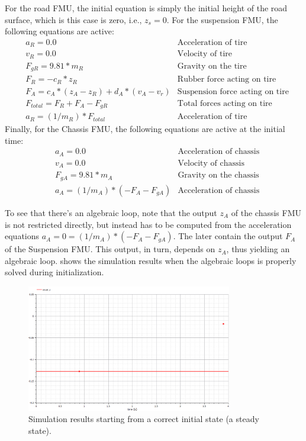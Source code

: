 For the road FMU, the initial equation is simply the initial height of the road surface, which is this case is zero, i.e., $z_s=0$.
For the suspension FMU, the following equations are active:
\begin{align}
& a_R = 0.0 & \text{Acceleration of tire} \\
& v_R = 0.0 & \text{Velocity of tire} \\
& F_{gR} = 9.81 * m_R  & \text{Gravity on the tire} \\
& F_R = - c_R * z_R  & \text{Rubber force acting on tire} \\
& F_A = c_A * (z_A - z_R) + d_A * (v_A - v_r)  & \text{Suspension force acting on tire} \\
& F_{\mathit{total}} = F_R + F_A - F_{gR} & \text{Total forces acting on tire} \\
& a_R = (1/m_R) * F_{\mathit{total}}  & \text{Acceleration of tire}
\end{align}
Finally, for the Chassis FMU, the following equations are active at the initial time:
\begin{align}
& a_A = 0.0 & \text{Acceleration of chassis} \\
& v_A = 0.0 & \text{Velocity of chassis} \\
& F_{gA} = 9.81 * m_A  & \text{Gravity on the chassis} \\
& a_A = (1/m_A) * (- F_A - F_{gA})  & \text{Acceleration of chassis}
\end{align}

To see that there's an algebraic loop, note that the output $z_A$ of the chassis FMU is not restricted directly, but instead has to be computed from the acceleration equations $a_A = 0 = (1/m_A) * (- F_A - F_{gA})$.
The later contain the output $F_A$ of the Suspension FMU.
This output, in turn, depends on $z_A$, thus yielding an algebraic loop.
 shows the simulation results when the algebraic loops is properly solved during initialization.

\begin{figure}[htb]
    \centering
    \includegraphics[width=0.8\textwidth]{images/init_state_correct_sim.png}
    \caption{Simulation results starting from a correct initial state (a steady state). }
    \label{fig:init_state_correct_sim}
\end{figure}

